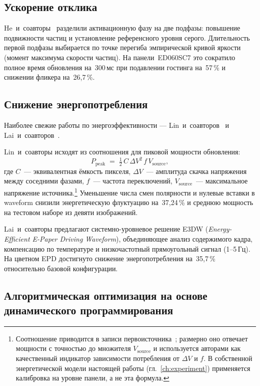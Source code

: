 \subsection*{Ускорение отклика}

He~и~соавторы~\cite{he2020_particle_activation} разделили активационную фазу на
две подфазы: повышение подвижности частиц и установление референсного уровня
серого. Длительность первой подфазы выбирается по точке перегиба эмпирической
кривой яркости (момент максимума скорости частиц). На панели~ED060SC7 это
сократило полное время обновления на~300\,мс при подавлении гостинга на~57\,\%
и снижении фликера на~26{,}7\,\%.

\subsection*{Снижение энергопотребления}

Наиболее свежие работы по энергоэффективности --- Lin~и~соавторов~\cite{lin2024_low_power}
и Lai~и~соавторов~\cite{lai2026_e3dw_energy}.

Lin~и~соавторы исходят из соотношения для пиковой мощности обновления:
\begin{equation}\label{eq:p-peak}
    P_{\text{peak}} \;=\; \tfrac{1}{2}\,C\,\Delta V^{2}\, f\, V_{\text{source}},
\end{equation}
где $C$~--- эквивалентная ёмкость пикселя, $\Delta V$~--- амплитуда скачка
напряжения между соседними фазами, $f$~--- частота переключений,
$V_{\text{source}}$~--- максимальное напряжение источника.\footnote{Соотношение
приводится в записи первоисточника~\cite{lin2024_low_power}; размерно оно
отвечает мощности с точностью до множителя $V_{\text{source}}$ и используется
авторами как качественный индикатор зависимости потребления от $\Delta V$ и
$f$. В собственной энергетической модели настоящей работы (гл.~\ref{ch:experiment})
применяется калибровка на уровне панели, а не эта формула.} Уменьшение числа
смен полярности и нулевые вставки в waveform снизили энергетическую флуктуацию
на~37{,}24\,\% и среднюю мощность на тестовом наборе из девяти изображений.

Lai~и~соавторы предлагают системно-уровневое решение E3DW
(\emph{Energy-Efficient E-Paper Driving Waveform}), объединяющее анализ
содержимого кадра, компенсацию по температуре и низкочастотный прямоугольный
сигнал (1--5\,Гц). На цветном EPD достигнуто снижение энергопотребления
на~35{,}7\,\% относительно базовой конфигурации.

\subsection*{Алгоритмическая оптимизация на основе динамического программирования}


